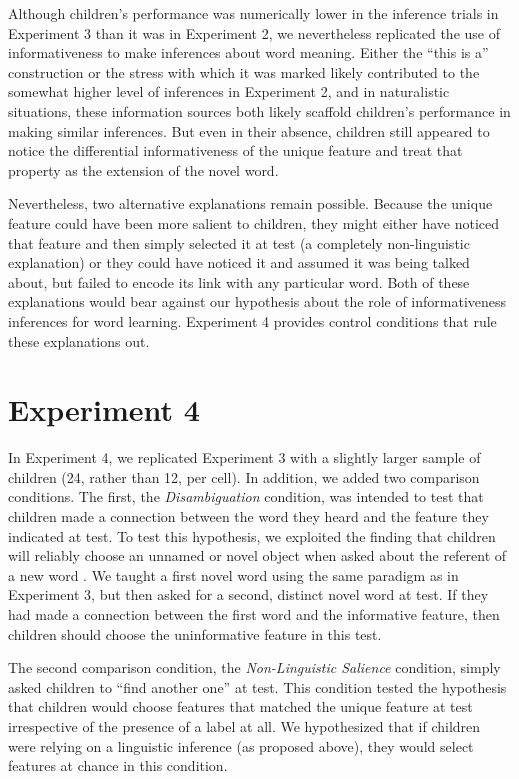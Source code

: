 \documentclass[review]{elsarticle}
\begin{document}
Although children's performance was numerically lower in the inference trials in Experiment 3 than it was in Experiment 2, we nevertheless replicated the use of informativeness to make inferences about word meaning. Either the ``this is a'' construction or the stress with which it was marked likely contributed to the somewhat higher level of inferences in Experiment 2, and in naturalistic situations, these information sources both likely scaffold children's performance in making similar inferences. But even in their absence, children still appeared to notice the differential informativeness of the unique feature and treat that property as the extension of the novel word. 

Nevertheless, two alternative explanations remain possible. Because the unique feature could have been more salient to children, they might either have noticed that feature and then simply selected it at test (a completely non-linguistic explanation) or they could have noticed it and assumed it was being talked about, but failed to encode its link with any particular word. Both of these explanations would bear against our hypothesis about the role of informativeness inferences for word learning. Experiment 4 provides control conditions that rule these explanations out. 

\section{Experiment 4}

In Experiment 4, we replicated Experiment 3 with a slightly larger sample of children (24, rather than 12, per cell). In addition, we added two comparison conditions. The first, the {\em Disambiguation} condition, was intended to test that children made a connection between the word they heard and the feature they indicated at test. To test this hypothesis, we exploited the finding that children will reliably choose an unnamed or novel object when asked about the referent of a new word \citep{markman1988,mervis1994}. We taught a first novel word using the same paradigm as in Experiment 3, but then asked for a second, distinct novel word at test. If they had made a connection between the first word and the informative feature, then children should choose the uninformative feature in this test. 

The second comparison condition, the {\em Non-Linguistic Salience} condition, simply asked children to ``find another one'' at test. This condition tested the hypothesis that children would choose features that matched the unique feature at test irrespective of the presence of a label at all. We hypothesized that if children were relying on a linguistic inference (as proposed above), they would select features at chance in this condition.
\end{document}
